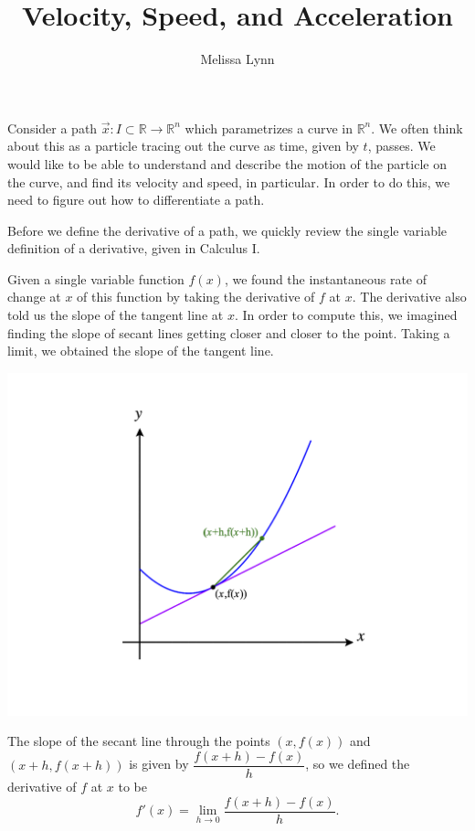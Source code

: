 \documentclass{ximera}
\title{Velocity, Speed, and Acceleration}
\author{Melissa Lynn}
\begin{document}
\begin{abstract}
\end{abstract}
\maketitle


Consider a path $\vec{x}:I\subset\mathbb{R}\rightarrow\mathbb{R}^n$ which parametrizes a curve in $\mathbb{R}^n$. We often think about this as a particle tracing out the curve as time, given by $t$, passes. We would like to be able to understand and describe the motion of the particle on the curve, and find its velocity and speed, in particular. In order to do this, we need to figure out how to differentiate a path.

Before we define the derivative of a path, we quickly review the single variable definition of a derivative, given in Calculus I.

Given a single variable function $f(x)$, we found the instantaneous rate of change at $x$ of this function by taking the derivative of $f$ at $x$. The derivative also told us the slope of the tangent line at $x$. In order to compute this, we imagined finding the slope of secant lines getting closer and closer to the point. Taking a limit, we obtained the slope of the tangent line.

\begin{image}
\includegraphics[width=\textwidth]{CalcPlot3D-sv_deriv}
\end{image}

The slope of the secant line through the points $(x,f(x))$ and $(x+h,f(x+h))$ is given by $\dfrac{f(x+h)-f(x)}{h}$, so we defined the derivative of $f$ at $x$ to be
\[
f'(x) = \lim_{h\rightarrow 0}\frac{f(x+h)-f(x)}{h}.
\]
\end{document}
